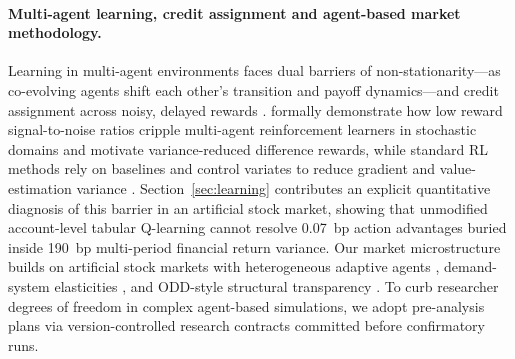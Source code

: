 \documentclass[11pt]{article}
\begin{document}
\paragraph{Multi-agent learning, credit assignment and agent-based market methodology.}
Learning in multi-agent environments faces dual barriers of non-stationarity---as co-evolving agents shift each other's transition and payoff dynamics---and credit assignment across noisy, delayed rewards \citep{shoham2007multiagent,busoniu2008comprehensive,hernandezleal2019survey}. \citet{agogino2008analyzing} formally demonstrate how low reward signal-to-noise ratios cripple multi-agent reinforcement learners in stochastic domains and motivate variance-reduced difference rewards, while standard RL methods rely on baselines and control variates to reduce gradient and value-estimation variance \citep{sutton2018reinforcement}. Section~\ref{sec:learning} contributes an explicit quantitative diagnosis of this barrier in an artificial stock market, showing that unmodified account-level tabular Q-learning \citep{watkins1992qlearning,evendar2003learning} cannot resolve 0.07~bp action advantages buried inside 190~bp multi-period financial return variance. Our market microstructure builds on artificial stock markets with heterogeneous adaptive agents \citep{arthur1997asset,lebaron2006agent,farmer2009economy}, demand-system elasticities \citep{koijen2019demand}, and ODD-style structural transparency \citep{grimm2020odd}. To curb researcher degrees of freedom in complex agent-based simulations, we adopt pre-analysis plans \citep{olken2015promises} via version-controlled research contracts committed before confirmatory runs.
\end{document}
